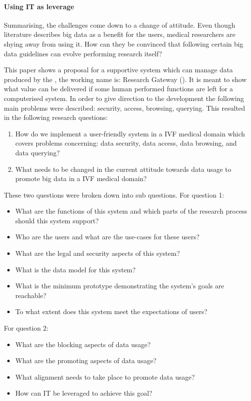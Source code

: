\paragraph{Using IT as leverage}
Summarising, the challenges come down to a change of attitude.
Even though literature describes big data as a benefit for the users, medical researchers are shying away from using it.
How can they be convinced that following certain big data guidelines can evolve performing research itself?

This paper shows a proposal for a supportive system which can manage data produced by the \project{}, the working name is: \project{} Research Gateway (\ivfsystem{}).
It is meant to show what value can be delivered if some human performed functions are left for a computerised system.
In order to give direction to the development the following main problems were described: security, access, browsing, querying.
This resulted in the following research questions:

\begin{enumerate}
	\item How do we implement a user-friendly system in a IVF medical domain which covers problems concerning: data security, data access, data browsing, and data querying?
	\item What needs to be changed in the current attitude towards data usage to promote big data in a IVF medical domain?
\end{enumerate}

These two questions were broken down into sub questions. 
For question 1:
\begin{itemize}
	\item What are the functions of this system and which parts of the research process should this system support?
	\item Who are the users and what are the use-cases for these users?
	\item What are the legal and security aspects of this system?
	\item What is the data model for this system?
	\item What is the minimum prototype demonstrating the system's goals are reachable? 
	\item To what extent does this system meet the expectations of users?
\end{itemize}

For question 2:
\begin{itemize}
	\item What are the blocking aspects of data usage?
	\item What are the promoting aspects of data usage?
	\item What alignment needs to take place to promote data usage?
	\item How can IT be leveraged to achieve this goal?
\end{itemize}